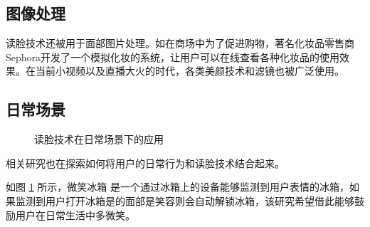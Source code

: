 \subsection{图像处理}
读脸技术还被用于面部图片处理。如在商场中为了促进购物，著名化妆品零售商Sephora开发了一个模拟化妆的系统，让用户可以在线查看各种化妆品的使用效果\cite{Sephora}。在当前小视频以及直播大火的时代，各类美颜技术和滤镜也被广泛使用。

\subsection{日常场景}
\begin{figure}[h]
    \centering
    \caption{读脸技术在日常场景下的应用}
    \label{fig:smile}
\end{figure}
相关研究也在探索如何将用户的日常行为和读脸技术结合起来。

如图 \ref{fig:smile} 所示，微笑冰箱\cite{Tsujita2011Smiling} 是一个通过冰箱上的设备能够监测到用户表情的冰箱，如果监测到用户打开冰箱是的面部是笑容则会自动解锁冰箱，该研究希望借此能够鼓励用户在日常生活中多微笑。 

